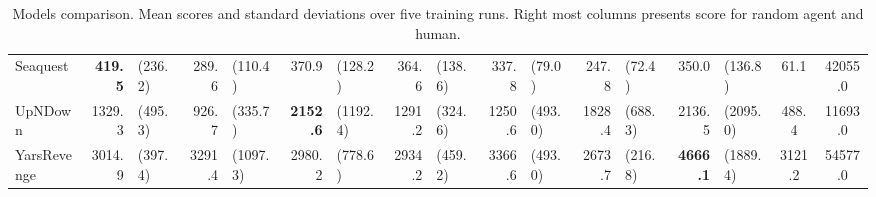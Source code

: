 \begin{landscape}
\begin{changemargin}{0cm}{0cm}
\begin{center}
\begin{table}[!htbp]
\begin{tabular}{l|rl|rl|rl|rl|rl|rl|rl|c|c}
Seaquest       &\textbf{    419.5 }&   (236.2) &    289.6 &    (110.4) &    370.9 &    (128.2) &    364.6 &    (138.6) &    337.8 &     (79.0) &    247.8 &     (72.4) &    350.0 &    (136.8) &     61.1 &  42055.0 \\
UpNDown        &   1329.3 &   (495.3) &    926.7 &    (335.7) &\textbf{   2152.6 }&   (1192.4) &   1291.2 &    (324.6) &   1250.6 &    (493.0) &   1828.4 &    (688.3) &   2136.5 &   (2095.0) &    488.4 &  11693.0 \\
YarsRevenge    &   3014.9 &   (397.4) &   3291.4 &   (1097.3) &   2980.2 &    (778.6) &   2934.2 &    (459.2) &   3366.6 &    (493.0) &   2673.7 &    (216.8) &\textbf{   4666.1 }&   (1889.4) &   3121.2 &  54577.0 \\
\end{tabular}
\caption{Models comparison. Mean scores and standard deviations over five training runs. Right most columns presents score for random agent and human.}
\label{tab:meanStdDev}
\end{table}
\vspace*{\fill}
\end{center}
\end{changemargin}
\end{landscape}

